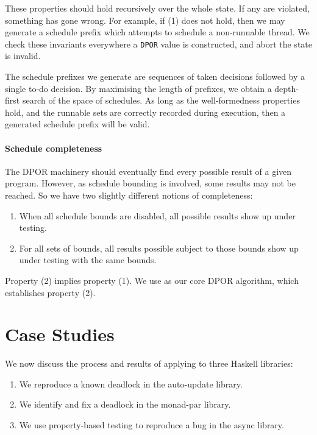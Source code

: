 These properties should hold recursively over the whole state.  If any
are violated, something has gone wrong.  For example, if (1) does not
hold, then we may generate a schedule prefix which attempts to
schedule a non-runnable thread.  We check these invariants everywhere
a \verb|DPOR| value is constructed, and abort the state is invalid.

The schedule prefixes we generate are sequences of taken decisions
followed by a single to-do decision.  By maximising the length of
prefixes, we obtain a depth-first search of the space of schedules.
As long as the well-formedness properties hold, and the runnable sets
are correctly recorded during execution, then a generated schedule
prefix will be valid.

\paragraph{Schedule completeness}
The DPOR machinery should eventually find every possible result of a
given program.  However, as schedule bounding is involved, some
results may not be reached.  So we have two slightly different notions
of completeness:

\begin{enumerate}
\item When all schedule bounds are disabled, all possible results show
  up under testing.
\item For all sets of bounds, all results possible subject to those
  bounds show up under testing with the same bounds.
\end{enumerate}

Property (2) implies property (1).  We use \cite{coons2013} as our
core DPOR algorithm, which establishes property (2).

\section{Case Studies}
\label{sec:dejafu-casestudies}

We now discuss the process and results of applying \dejafu{} to three
Haskell libraries:

\begin{enumerate}
\item We reproduce a known deadlock in the auto-update
  library\cite{auto_update}.
\item We identify and fix a deadlock in the monad-par
  library\cite{monad_par,marlow2011}.
\item We use property-based testing to reproduce a bug in the async
  library\cite{async}.
\end{enumerate}

